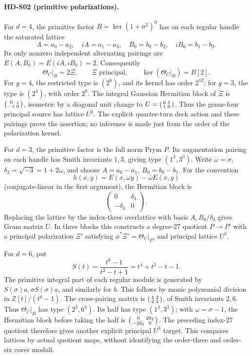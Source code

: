 \paragraph{HD-S02 (primitive polarizations).}
For \(d=4\), the primitive factor
\(B=\ker(1+\sigma^2)^0\) has on each regular handle the saturated lattice
\[
 A=a_0-a_2,\quad iA=a_1-a_3,\quad
 B_0=b_0-b_2,\quad iB_0=b_1-b_3.
\]
Its only nonzero independent alternating pairings are
\(E(A,B_0)=E(iA,iB_0)=2\).
Consequently
\[
 \Theta_C|_B=2\Xi,\qquad \Xi\text{ principal},\qquad
 \ker(\Theta_C|_B)=B[2].
\]
For \(g=4\), the restricted type is \((2^6)\), and its kernel has order
\(2^{12}\); for \(g=3\), the type is \((2^4)\), with order \(2^8\).
The integral Gaussian Hermitian block of \(\Xi\) is
\(\begin{psmallmatrix}0&i\\-i&0\end{psmallmatrix}\), isometric by a
diagonal unit change to \(U=\begin{psmallmatrix}0&1\\1&0\end{psmallmatrix}\).
Thus the genus-four principal source has lattice \(U^3\).
The explicit quarter-turn deck action and these pairings prove the assertion;
no inference is made just from the order of the polarization kernel.

For \(d=3\), the primitive factor is the full norm Prym \(P\).
Its augmentation pairing on each handle has Smith invariants \(1,3\),
giving type \((1^3,3^3)\).
Write \(\omega=\sigma\), \(\delta_3=\sqrt{-3}=1+2\omega\), and choose
\(A=a_0-a_1,\ B_0=b_0-b_1\).
For the convention
\[
 h(x,y)=E(x,\omega y)-\bar\omega E(x,y)
\]
(conjugate-linear in the first argument), the Hermitian block is
\[
 \begin{pmatrix}0&\delta_3\\-\delta_3&0\end{pmatrix}.
\]
Replacing the lattice by the index-three overlattice with basis
\(A,B_0/\delta_3\) gives Gram matrix \(U\).
In three blocks this constructs a degree-27 quotient
\(P\to P'\) with a principal polarization \(\Xi'\) satisfying
\(\phi^*\Xi'=\Theta_C|_P\), and principal lattice \(U^3\).

For \(d=6\), put
\[
 S(t)=\frac{t^6-1}{t^2-t+1}=t^4+t^3-t-1.
\]
The primitive integral part of each regular module is generated by
\(S(\sigma)a,\sigma S(\sigma)a\), and similarly for \(b\).
This follows by monic polynomial division in
\(\mathbb Z[t]/(t^6-1)\). The cross-pairing matrix is
\(\begin{psmallmatrix}4&2\\2&4\end{psmallmatrix}\), of Smith invariants \(2,6\).
Thus \(\Theta_C|_B\) has type \((2^3,6^3)\).
Its half has type \((1^3,3^3)\); with \(\omega=\sigma-1\), the Hermitian
block before taking the half is
\(\begin{psmallmatrix}0&2\delta_3\\-2\delta_3&0\end{psmallmatrix}\).
The preceding index-27 quotient therefore gives another explicit
principal \(U^3\) target. This compares lattices by actual quotient maps,
without identifying the order-three and order-six cover moduli.

